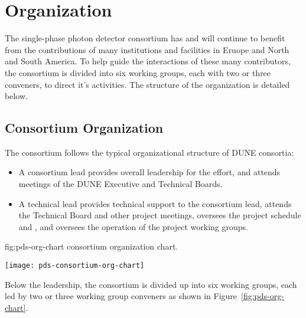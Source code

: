 \section{Organization}
\label{sec:fdsp-pd-org}

The single-phase photon detector consortium has and will continue to benefit from the contributions of many institutions and facilities in Eruope and North and South America.  To help guide the interactions of these many contributors, the consortium is divided into six working groups, each with two or three conveners, to direct it's activities.   The structure of the organization is detailed below.

\subsection{Consortium Organization}
\label{sec:fdsp-pd-org-consortium}

The \single {} consortium follows the typical organizational structure of DUNE consortia:
\begin{itemize}
\item A consortium lead
provides overall leadership for the effort, and attends meetings of the DUNE Executive and Technical Boards.
\item A technical lead 
provides technical support to the consortium lead, attends the Technical Board and other project meetings, oversees the project schedule and , and oversees the operation of the project working groups.  
\end{itemize}

\begin{dunefigure}{fig:pds-org-chart}
{ consortium organization chart.}

	\texttt{[image: pds-consortium-org-chart]}
	
\end{dunefigure} 



Below the leadership, the consortium is divided up into six working groups, each led by two or three working group conveners as shown in Figure~\ref{fig:pds-org-chart}. 


